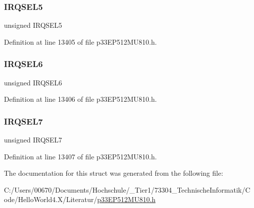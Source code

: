 \subsubsection{\texorpdfstring{I\+R\+Q\+S\+E\+L5}{IRQSEL5}}
{\footnotesize\ttfamily unsigned I\+R\+Q\+S\+E\+L5}



Definition at line 13405 of file p33\+E\+P512\+M\+U810.\+h.

\mbox{\label{structtag_d_m_a10_r_e_q_b_i_t_s_ace52408ef8c29561f3c56a3fbcbc8217}} 
\subsubsection{\texorpdfstring{I\+R\+Q\+S\+E\+L6}{IRQSEL6}}
{\footnotesize\ttfamily unsigned I\+R\+Q\+S\+E\+L6}



Definition at line 13406 of file p33\+E\+P512\+M\+U810.\+h.

\mbox{\label{structtag_d_m_a10_r_e_q_b_i_t_s_acce7dedecdf1f53cdbead3edf7c5d53a}} 
\subsubsection{\texorpdfstring{I\+R\+Q\+S\+E\+L7}{IRQSEL7}}
{\footnotesize\ttfamily unsigned I\+R\+Q\+S\+E\+L7}



Definition at line 13407 of file p33\+E\+P512\+M\+U810.\+h.



The documentation for this struct was generated from the following file\+:\begin{DoxyCompactItemize}
\item 
C\+:/\+Users/00670/\+Documents/\+Hochschule/\+\_\+\+Tier1/73304\+\_\+\+Technische\+Informatik/\+Code/\+Hello\+World4.\+X/\+Literatur/\hyperlink{p33_e_p512_m_u810_8h}{p33\+E\+P512\+M\+U810.\+h}\end{DoxyCompactItemize}

